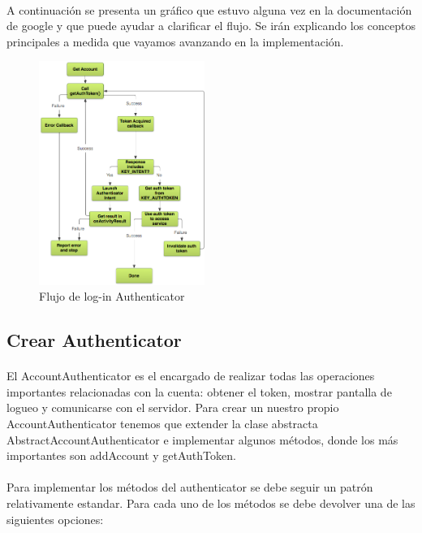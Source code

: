 \documentclass[10pt]{extarticle}
\begin{document}
\paragraph{}
A continuación se presenta un gráfico que estuvo alguna vez en la documentación de google y que puede ayudar a clarificar el flujo. Se irán explicando los conceptos principales a medida que vayamos avanzando en la implementación.

\begin{figure}[H]
    \centering
    \includegraphics[width=0.48\textwidth]{flujo_authenticator.png}
    \caption{Flujo de log-in Authenticator}
    \label{fig:flujo_authenticator}
\end{figure}

\subsection{Crear Authenticator}

\paragraph{}
El AccountAuthenticator es el encargado de realizar todas las operaciones importantes relacionadas con la cuenta: obtener el token, mostrar pantalla de logueo y comunicarse con el servidor. Para crear un nuestro propio AccountAuthenticator tenemos que extender la clase abstracta AbstractAccountAuthenticator e implementar algunos métodos, donde los más importantes son addAccount y getAuthToken.

\paragraph{}
Para implementar los métodos del authenticator se debe seguir un patrón relativamente estandar. Para cada uno de los métodos se debe devolver una de las siguientes opciones:
\end{document}

